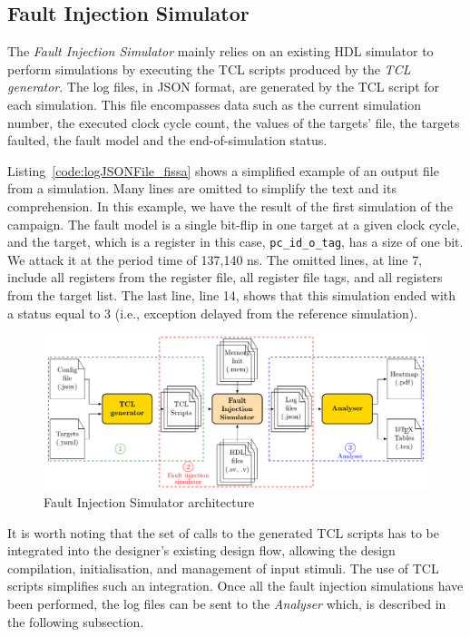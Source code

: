 \subsection{Fault Injection Simulator}
\label{subsec:FIS}

The \textit{Fault Injection Simulator} mainly relies on an existing HDL simulator to perform simulations by executing the TCL scripts produced by the \textit{TCL generator}. The log files, in JSON format, are generated by the TCL script for each simulation.
This file encompasses data such as the current simulation number, the executed clock cycle count, the values of the targets' file, the targets faulted, the fault model and the end-of-simulation status.

Listing~\ref{code:logJSONFile_fissa} shows a simplified example of an output file from a simulation. Many lines are omitted to simplify the text and its comprehension. In this example, we have the result of the first simulation of the campaign. The fault model is a single bit-flip in one target at a given clock cycle, and the target, which is a register in this case, \texttt{pc\_id\_o\_tag}, has a size of one bit. We attack it at the period time of 137,140 ns. The omitted lines, at line 7, include all registers from the register file, all register file tags, and all registers from the target list. The last line, line 14, shows that this simulation ended with a status equal to 3 (i.e., exception delayed from the reference simulation).

\begin{figure}[ht]
    \centering
    \includegraphics[width=.5\textwidth, page=4]{c4_fissa/img/fissa/archi_fissa.pdf}
    \caption{Fault Injection Simulator architecture}
    \label{fig:archi_fis}
\end{figure}

It is worth noting that the set of calls to the generated TCL scripts has to be integrated into the designer's existing design flow, allowing the design compilation, initialisation, and management of input stimuli. The use of TCL scripts simplifies such an integration. 
Once all the fault injection simulations have been performed, the log files can be sent to the \textit{Analyser} which, is described in the following subsection.

